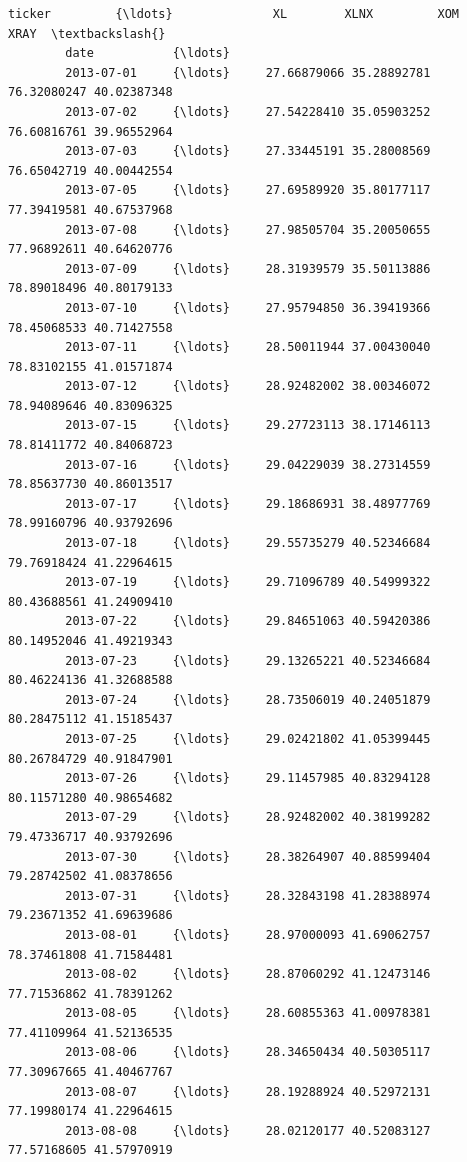 \documentclass[11pt]{article}
\begin{document}
\begin{Verbatim}[commandchars=\\\{\}]
        ticker         {\ldots}              XL        XLNX         XOM        XRAY  \textbackslash{}
        date           {\ldots}                                                       
        2013-07-01     {\ldots}     27.66879066 35.28892781 76.32080247 40.02387348   
        2013-07-02     {\ldots}     27.54228410 35.05903252 76.60816761 39.96552964   
        2013-07-03     {\ldots}     27.33445191 35.28008569 76.65042719 40.00442554   
        2013-07-05     {\ldots}     27.69589920 35.80177117 77.39419581 40.67537968   
        2013-07-08     {\ldots}     27.98505704 35.20050655 77.96892611 40.64620776   
        2013-07-09     {\ldots}     28.31939579 35.50113886 78.89018496 40.80179133   
        2013-07-10     {\ldots}     27.95794850 36.39419366 78.45068533 40.71427558   
        2013-07-11     {\ldots}     28.50011944 37.00430040 78.83102155 41.01571874   
        2013-07-12     {\ldots}     28.92482002 38.00346072 78.94089646 40.83096325   
        2013-07-15     {\ldots}     29.27723113 38.17146113 78.81411772 40.84068723   
        2013-07-16     {\ldots}     29.04229039 38.27314559 78.85637730 40.86013517   
        2013-07-17     {\ldots}     29.18686931 38.48977769 78.99160796 40.93792696   
        2013-07-18     {\ldots}     29.55735279 40.52346684 79.76918424 41.22964615   
        2013-07-19     {\ldots}     29.71096789 40.54999322 80.43688561 41.24909410   
        2013-07-22     {\ldots}     29.84651063 40.59420386 80.14952046 41.49219343   
        2013-07-23     {\ldots}     29.13265221 40.52346684 80.46224136 41.32688588   
        2013-07-24     {\ldots}     28.73506019 40.24051879 80.28475112 41.15185437   
        2013-07-25     {\ldots}     29.02421802 41.05399445 80.26784729 40.91847901   
        2013-07-26     {\ldots}     29.11457985 40.83294128 80.11571280 40.98654682   
        2013-07-29     {\ldots}     28.92482002 40.38199282 79.47336717 40.93792696   
        2013-07-30     {\ldots}     28.38264907 40.88599404 79.28742502 41.08378656   
        2013-07-31     {\ldots}     28.32843198 41.28388974 79.23671352 41.69639686   
        2013-08-01     {\ldots}     28.97000093 41.69062757 78.37461808 41.71584481   
        2013-08-02     {\ldots}     28.87060292 41.12473146 77.71536862 41.78391262   
        2013-08-05     {\ldots}     28.60855363 41.00978381 77.41109964 41.52136535   
        2013-08-06     {\ldots}     28.34650434 40.50305117 77.30967665 41.40467767   
        2013-08-07     {\ldots}     28.19288924 40.52972131 77.19980174 41.22964615   
        2013-08-08     {\ldots}     28.02120177 40.52083127 77.57168605 41.57970919   

\end{Verbatim}
\end{document}
